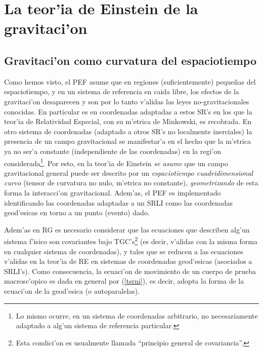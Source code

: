 \chapter{La teor'ia de Einstein de la gravitaci'on}\label{capTEG}

\section{Gravitaci'on como curvatura del espaciotiempo\label{PE}}

Como hemos visto, el PEF asume que en regiones (suficientemente) peque\~nas del espaciotiempo, y en un sistema de referencia en caida libre, los efectos de la gravitaci'on desaparecen y son por lo tanto v'alidas las leyes no-gravitacionales conocidas. En particular es en coordenadas adaptadas a estos SR's en los que la teor'ia de Relatividad Especial, con su m'etrica de Minkowski, es recobrada. En otro sistema de coordenadas (adaptado a otros SR's no localmente inerciales) la presencia de un campo gravitacional se manifestar'a en el hecho que la m'etrica ya no ser'a constante (independiente de las coordenadas) en la regi'on considerada\footnote{Lo mismo ocurre, en un sistema de coordenadas arbitrario, no necesariamente adaptado a alg'un sistema de referencia particular.}. Por esto, en la teor'ia de Einstein \textit{se asume} que un campo gravitacional general puede ser descrito por un \textit{espaciotiempo cuadridimensional curvo} (tensor de curvatura no nulo, m'etrica no constante), \textit{geometrizando} de esta forma la interacci'on gravitacional. Adem'as, el PEF es implementado identificando las coordenadas adaptadas a un SRLI como las coordenadas geod'esicas en torno a un punto (evento) dado.

Adem'as en RG es necesario considerar que las ecuaciones que describen alg'un sistema f'isico son covariantes bajo TGC's\footnote{Esta condici'on es usualmente llamada ``principio general de covariancia''.} (es decir, v'alidas con la misma forma en cualquier sistema de coordenadas), y tales que se reducen a las ecuaciones v'alidas en la teor'ia de RE en sistemas de coordenadas geod'esicas (asociados a SRLI's). Como consecuencia, la ecuaci'on de movimiento de un cuerpo de prueba macrosc'opico es dada en general por (\ref{tsrni}), es decir, adopta la forma de la ecuaci'on de la geod'esica (o autoparalelas).

